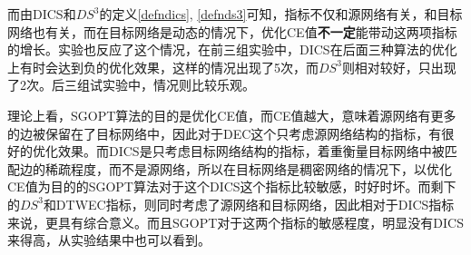 而由DICS和$DS^3$的定义\ref{defndics}, \ref{defnds3}可知，指标不仅和源网络有关，和目标网络也有关，而在目标网络是动态的情况下，优化CE值\textbf{不一定}能带动这两项指标的增长。实验也反应了这个情况，在前三组实验中，DICS在后面三种算法的优化上有时会达到负的优化效果，这样的情况出现了5次，而$DS^3$则相对较好，只出现了2次。后三组试实验中，情况则比较乐观。

理论上看，SGOPT算法的目的是优化CE值，而CE值越大，意味着源网络有更多的边被保留在了目标网络中，因此对于DEC这个只考虑源网络结构的指标，有很好的优化效果。而DICS是只考虑目标网络结构的指标，着重衡量目标网络中被匹配边的稀疏程度，而不是源网络，所以在目标网络是稠密网络的情况下，以优化CE值为目的的SGOPT算法对于这个DICS这个指标比较敏感，时好时坏。而剩下的$DS^3$和DTWEC指标，则同时考虑了源网络和目标网络，因此相对于DICS指标来说，更具有综合意义。而且SGOPT对于这两个指标的敏感程度，明显没有DICS来得高，从实验结果中也可以看到。


